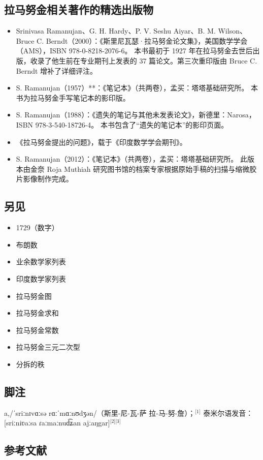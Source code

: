 \subsection{拉马努金相关著作的精选出版物}
\begin{itemize}
\item Srinivasa Ramanujan、G. H. Hardy、P. V. Seshu Aiyar、B. M. Wilson、Bruce C. Berndt（2000）：《斯里尼瓦瑟·拉马努金论文集》，美国数学学会（AMS），ISBN 978-0-8218-2076-6。
  本书最初于 1927 年在拉马努金去世后出版，收录了他生前在专业期刊上发表的 37 篇论文。第三次重印版由 Bruce C. Berndt 增补了详细评注。
\item S. Ramanujan（1957）**：《笔记本》（共两卷），孟买：塔塔基础研究所。
  本书为拉马努金手写笔记本的影印版。
\item S. Ramanujan（1988）：《遗失的笔记与其他未发表论文》，新德里：Narosa，ISBN 978-3-540-18726-4。
  本书包含了“遗失的笔记本”的影印页面。
\item 《拉马努金提出的问题》，载于《印度数学学会期刊》。
\item S. Ramanujan（2012）：《笔记本》（共两卷），孟买：塔塔基础研究所。
  此版本由金奈 Roja Muthiah 研究图书馆的档案专家根据原始手稿的扫描与缩微胶片影像制作完成。
\end{itemize}
\subsection{另见}
\begin{itemize}
\item 1729（数字）
\item 布朗数
\item 业余数学家列表
\item 印度数学家列表
\item 拉马努金图
\item 拉马努金求和
\item 拉马努金常数
\item 拉马努金三元二次型
\item 分拆的秩
\end{itemize}
\subsection{脚注}
a,/ˈsriːnɪvɑːsə rɑːˈmɑːnʊdʒən/（斯里-尼-瓦-萨 拉-马-努-詹）；\(^\text{[1]}\) 泰米尔语发音：[sriːniʋaːsa ɾaːmaːnud͡ʑan ajːaŋgar]\(^\text{[2][3]}\)
\subsection{参考文献}

